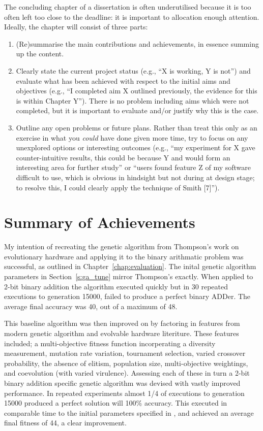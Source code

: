 \noindent
{
	\color{red}
The concluding chapter of a dissertation is often underutilised because it
is too often left too close to the deadline: it is important to allocation
enough attention.  Ideally, the chapter will consist of three parts:

\begin{enumerate}
\item (Re)summarise the main contributions and achievements, in essence
      summing up the content.
\item Clearly state the current project status (e.g., ``X is working, Y
      is not'') and evaluate what has been achieved with respect to the
      initial aims and objectives (e.g., ``I completed aim X outlined
      previously, the evidence for this is within Chapter Y'').  There
      is no problem including aims which were not completed, but it is
      important to evaluate and/or justify why this is the case.
\item Outline any open problems or future plans.  Rather than treat this
      only as an exercise in what you {\em could} have done given more
      time, try to focus on any unexplored options or interesting outcomes
      (e.g., ``my experiment for X gave counter-intuitive results, this
      could be because Y and would form an interesting area for further
      study'' or ``users found feature Z of my software difficult to use,
      which is obvious in hindsight but not during at design stage; to
      resolve this, I could clearly apply the technique of Smith [7]'').
\end{enumerate}
}

\section{Summary of Achievements}
My intention of recreating the genetic algorithm from Thompson's work on
evolutionary hardware \cite{10.1007/3-540-63173-9_61} and applying it to the
binary arithmatic problem was successful, as outlined in Chapter~\ref{chap:evaluation}.
The inital genetic algorithm parameters in Section~\ref{s:ga_tune} mirror
Thompson's exactly. When applied to 2-bit binary addition the algorithm
executed quickly but in 30 repeated executions to generation 15000, failed to produce a perfect
binary ADDer. The average final accuracy was 40, out of a maximum of 48.

This baseline algorithm was then improved on by factoring in features from
modern genetic algorithm and evolvable hardware literiture.
These features included; a
multi-objective fitness function incorperating a diversity measurement,
mutation rate variation, tournament selection, varied crossover probability,
the absence of elitism, population size, multi-objective weightings, and
coevolution (with varied virulence). Assessing each of these in turn
a 2-bit binary addition specific genetic algorithm was devised with vastly
improved performance. In repeated experiments almost 1/4 of executions to
generation 15000 produced a perfect solution will 100\% accuracy. This
executed in comparable time to the initial parameters specified in
\cite{10.1007/3-540-63173-9_61}, and achieved an average final fitness of 44,
a clear improvement.

